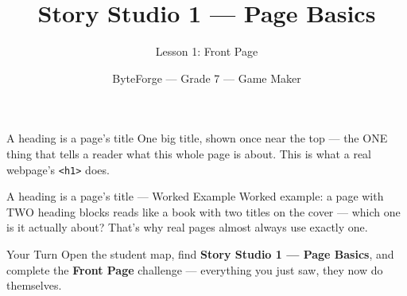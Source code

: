\documentclass[aspectratio=169]{beamer}
\title{Story Studio 1 — Page Basics}
\subtitle{Lesson 1: Front Page}
\author{ByteForge --- Grade 7 --- Game Maker}
\date{}
\begin{document}
\begin{frame}
    \titlepage
\end{frame}

\begin{frame}{A heading is a page's title}
    \Large
    One big title, shown once near the top — the ONE thing that tells a reader what this whole page is about. This is what a real webpage's \texttt{<h1>} does.

    \begin{center}
    \end{center}
\end{frame}

\begin{frame}{A heading is a page's title --- Worked Example}
    \Large
    Worked example: a page with TWO heading blocks reads like a book with two titles on the cover — which one is it actually about? That's why real pages almost always use exactly one.
\end{frame}

\begin{frame}{Your Turn}
    \Large
    Open the student map, find \textbf{Story Studio 1 — Page Basics}, and complete
    the \textbf{Front Page} challenge --- everything you just saw, they now do themselves.
\end{frame}
\end{document}
